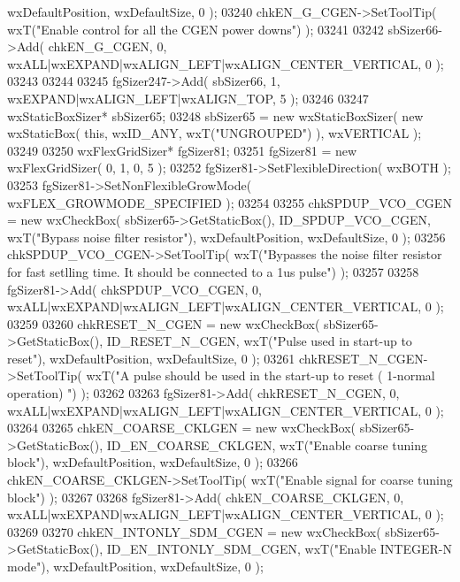 \begin{DoxyCode}
      wxDefaultPosition, wxDefaultSize, 0 );
03240     chkEN_G_CGEN->SetToolTip( wxT(\textcolor{stringliteral}{"Enable control for all the CGEN power downs"}) );
03241     
03242     sbSizer66->Add( chkEN_G_CGEN, 0, wxALL|wxEXPAND|wxALIGN\_LEFT|wxALIGN\_CENTER\_VERTICAL, 0 );
03243     
03244     
03245     fgSizer247->Add( sbSizer66, 1, wxEXPAND|wxALIGN\_LEFT|wxALIGN\_TOP, 5 );
03246     
03247     wxStaticBoxSizer* sbSizer65;
03248     sbSizer65 = \textcolor{keyword}{new} wxStaticBoxSizer( \textcolor{keyword}{new} wxStaticBox( \textcolor{keyword}{this}, wxID\_ANY, wxT(\textcolor{stringliteral}{"UNGROUPED"}) ), wxVERTICAL );
03249     
03250     wxFlexGridSizer* fgSizer81;
03251     fgSizer81 = \textcolor{keyword}{new} wxFlexGridSizer( 0, 1, 0, 5 );
03252     fgSizer81->SetFlexibleDirection( wxBOTH );
03253     fgSizer81->SetNonFlexibleGrowMode( wxFLEX\_GROWMODE\_SPECIFIED );
03254     
03255     chkSPDUP_VCO_CGEN = \textcolor{keyword}{new} wxCheckBox( sbSizer65->GetStaticBox(), 
      ID_SPDUP_VCO_CGEN, wxT(\textcolor{stringliteral}{"Bypass noise filter resistor"}), wxDefaultPosition, wxDefaultSize, 0 );
03256     chkSPDUP_VCO_CGEN->SetToolTip( wxT(\textcolor{stringliteral}{"Bypasses the noise filter resistor for fast setlling time. It
       should be connected to a 1us pulse"}) );
03257     
03258     fgSizer81->Add( chkSPDUP_VCO_CGEN, 0, wxALL|wxEXPAND|wxALIGN\_LEFT|wxALIGN\_CENTER\_VERTICAL, 0 );
03259     
03260     chkRESET_N_CGEN = \textcolor{keyword}{new} wxCheckBox( sbSizer65->GetStaticBox(), ID_RESET_N_CGEN, wxT(\textcolor{stringliteral}{"Pulse used in
       start-up to reset"}), wxDefaultPosition, wxDefaultSize, 0 );
03261     chkRESET_N_CGEN->SetToolTip( wxT(\textcolor{stringliteral}{"A pulse should be used in the start-up to reset ( 1-normal operation)
      "}) );
03262     
03263     fgSizer81->Add( chkRESET_N_CGEN, 0, wxALL|wxEXPAND|wxALIGN\_LEFT|wxALIGN\_CENTER\_VERTICAL, 0 );
03264     
03265     chkEN_COARSE_CKLGEN = \textcolor{keyword}{new} wxCheckBox( sbSizer65->GetStaticBox(), 
      ID_EN_COARSE_CKLGEN, wxT(\textcolor{stringliteral}{"Enable coarse tuning block"}), wxDefaultPosition, wxDefaultSize, 0 );
03266     chkEN_COARSE_CKLGEN->SetToolTip( wxT(\textcolor{stringliteral}{"Enable signal for coarse tuning block"}) );
03267     
03268     fgSizer81->Add( chkEN_COARSE_CKLGEN, 0, wxALL|wxEXPAND|wxALIGN\_LEFT|wxALIGN\_CENTER\_VERTICAL, 0 );
03269     
03270     chkEN_INTONLY_SDM_CGEN = \textcolor{keyword}{new} wxCheckBox( sbSizer65->GetStaticBox(), 
      ID_EN_INTONLY_SDM_CGEN, wxT(\textcolor{stringliteral}{"Enable INTEGER-N mode"}), wxDefaultPosition, wxDefaultSize, 0 );

\end{DoxyCode}

